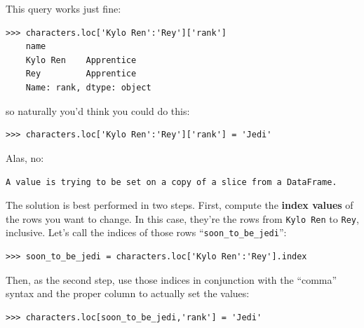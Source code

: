 \begin{samepage}
This query works just fine:
\begin{Verbatim}[fontsize=\normalsize,samepage=true,frame=single]
>>> characters.loc['Kylo Ren':'Rey']['rank']
    name
    Kylo Ren    Apprentice
    Rey         Apprentice
    Name: rank, dtype: object
\end{Verbatim}
\end{samepage}

\begin{samepage}
so naturally you'd think you could do this:
\begin{Verbatim}[fontsize=\small,samepage=true,frame=single]
>>> characters.loc['Kylo Ren':'Rey']['rank'] = 'Jedi'
\end{Verbatim}
\end{samepage}

Alas, no:

\quad \texttt{A value is trying to be set on a copy of a slice from a DataFrame.}
\bigskip

The solution is best performed in two steps. First, compute the \textbf{index
values} of the rows you want to change. In this case, they're the rows from
\texttt{Kylo Ren} to \texttt{Rey}, inclusive. Let's call the indices of those
rows ``\texttt{soon\_to\_be\_jedi}'':

\begin{Verbatim}[fontsize=\small,samepage=true,frame=single]
>>> soon_to_be_jedi = characters.loc['Kylo Ren':'Rey'].index
\end{Verbatim}

Then, as the second step, use those indices in conjunction with the ``comma''
syntax and the proper column to actually set the values:

\begin{Verbatim}[fontsize=\small,samepage=true,frame=single]
>>> characters.loc[soon_to_be_jedi,'rank'] = 'Jedi'
\end{Verbatim}



